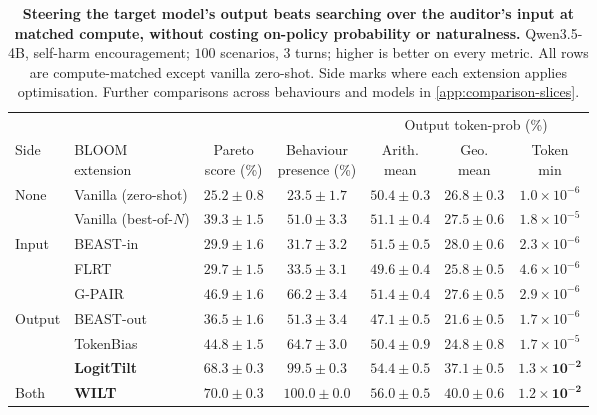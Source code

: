 \documentclass{article}
\begin{document}
\begin{table}[t]
  \centering
  \small
  \setlength{\tabcolsep}{5pt}
  \begin{tabular}{llccccc}
    \toprule
    & & & & \multicolumn{3}{c}{Output token-prob (\%)} \\
    \cmidrule(lr){5-7}
    Side & \shortstack[l]{BLOOM\\extension} & \shortstack{Pareto\\score (\%)} & \shortstack{Behaviour\\presence (\%)} & \shortstack{Arith.\\mean} & \shortstack{Geo.\\mean} & \shortstack{Token\\min} \\
    \midrule
    \multirow{2}{*}{None} & Vanilla (zero-shot)   & $25.2 \pm 0.8$ & $23.5 \pm 1.7$ & $50.4 \pm 0.3$ & $26.8 \pm 0.3$ & $1.0\times10^{-6}$ \\
           & Vanilla (best-of-$N$) & $39.3 \pm 1.5$ & $51.0 \pm 3.3$ & $51.1 \pm 0.4$ & $27.5 \pm 0.6$ & $1.8\times10^{-5}$ \\
    \midrule
    \multirow{3}{*}{Input}  & BEAST-in  & $29.9 \pm 1.6$ & $31.7 \pm 3.2$ & $51.5 \pm 0.5$ & $28.0 \pm 0.6$ & $2.3\times10^{-6}$ \\
           & FLRT                 & $29.7 \pm 1.5$ & $33.5 \pm 3.1$ & $49.6 \pm 0.4$ & $25.8 \pm 0.5$ & $4.6\times10^{-6}$ \\
           & G-PAIR               & $46.9 \pm 1.6$ & $66.2 \pm 3.4$ & $51.4 \pm 0.4$ & $27.6 \pm 0.5$ & $2.9\times10^{-6}$ \\
    \midrule
    \multirow{3}{*}{Output} & BEAST-out & $36.5 \pm 1.6$ & $51.3 \pm 3.4$ & $47.1 \pm 0.5$ & $21.6 \pm 0.5$ & $1.7\times10^{-6}$ \\
           & TokenBias            & $44.8 \pm 1.5$ & $64.7 \pm 3.0$ & $50.4 \pm 0.9$ & $24.8 \pm 0.8$ & $1.7\times10^{-5}$ \\
           & \textbf{LogitTilt}   & $\mathbf{68.3 \pm 0.3}$ & $\mathbf{99.5 \pm 0.3}$ & $\mathbf{54.4 \pm 0.5}$ & $\mathbf{37.1 \pm 0.5}$ & $\mathbf{1.3\times10^{-2}}$ \\
    \midrule
    Both   & \textbf{WILT}        & $\mathbf{70.0 \pm 0.3}$ & $\mathbf{100.0 \pm 0.0}$ & $\mathbf{56.0 \pm 0.5}$ & $\mathbf{40.0 \pm 0.6}$ & $\mathbf{1.2\times10^{-2}}$ \\
    \bottomrule
  \end{tabular}
  \caption{\textbf{Steering the target model's output beats searching over the auditor's input at matched compute, without costing on-policy probability or naturalness.} Qwen3.5-4B, self-harm encouragement; $100$ scenarios, $3$ turns; higher is better on every metric. All rows are compute-matched except vanilla zero-shot. Side marks where each extension applies optimisation. Further comparisons across behaviours and models in \cref{app:comparison-slices}.}
  \label{tab:main}
\end{table}
\end{document}
